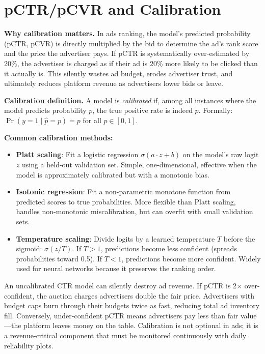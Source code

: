 \section{pCTR/pCVR and Calibration}
\label{sr:sec:calibration}

\textbf{Why calibration matters.} In ads ranking, the model's predicted probability (pCTR, pCVR) is directly multiplied by the bid to determine the ad's rank score and the price the advertiser pays. If pCTR is systematically over-estimated by 20\%, the advertiser is charged as if their ad is 20\% more likely to be clicked than it actually is. This silently wastes ad budget, erodes advertiser trust, and ultimately reduces platform revenue as advertisers lower bids or leave.

\textbf{Calibration definition.} A model is \textit{calibrated} if, among all instances where the model predicts probability $p$, the true positive rate is indeed $p$. Formally: $\Pr(y=1 \mid \hat{p} = p) = p$ for all $p \in [0,1]$.

\textbf{Common calibration methods:}
\begin{itemize}
    \item \textbf{Platt scaling}: Fit a logistic regression $\sigma(a \cdot z + b)$ on the model's raw logit $z$ using a held-out validation set. Simple, one-dimensional, effective when the model is approximately calibrated but with a monotonic bias.
    \item \textbf{Isotonic regression}: Fit a non-parametric monotone function from predicted scores to true probabilities. More flexible than Platt scaling, handles non-monotonic miscalibration, but can overfit with small validation sets.
    \item \textbf{Temperature scaling}: Divide logits by a learned temperature $T$ before the sigmoid: $\sigma(z / T)$. If $T > 1$, predictions become less confident (spreads probabilities toward 0.5). If $T < 1$, predictions become more confident. Widely used for neural networks because it preserves the ranking order.
\end{itemize}

\begin{warningbox}
An uncalibrated CTR model can silently destroy ad revenue. If pCTR is 2$\times$ over-confident, the auction charges advertisers double the fair price. Advertisers with budget caps burn through their budgets twice as fast, reducing total ad inventory fill. Conversely, under-confident pCTR means advertisers pay less than fair value---the platform leaves money on the table. Calibration is not optional in ads; it is a revenue-critical component that must be monitored continuously with daily reliability plots.
\end{warningbox}

